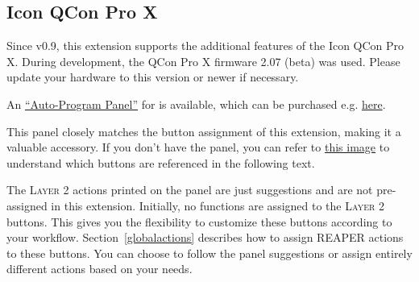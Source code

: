 \subsection{Icon QCon Pro X}\label{prox}

Since v0.9, this extension supports the additional features of the
Icon QCon Pro X. During development, the QCon Pro X firmware 2.07 (beta)
was used. Please update your hardware to this version or newer if
necessary.

An 
\href{https://s3.amazonaws.com/assets.icon-global.com/wp-content/uploads/2019/04/APP2-Reaper.jpg}{``Auto-Program
  Panel''} for \reaper is available, which can be purchased
e.g. \href{https://iconproaudio.com/shop/qcon-pro-x-auto-program-panel/}{here}.

This panel closely matches the button assignment of this extension,
making it a valuable accessory. If you don't have the panel, you can
refer to
\href{https://s3.amazonaws.com/assets.icon-global.com/wp-content/uploads/2019/04/APP2-Reaper.jpg}{this
  image} to understand which buttons are referenced in the following
text.

The \textsc{Layer 2} actions printed on the panel are just suggestions
and are not pre-assigned in this extension. Initially, no functions
are assigned to the \textsc{Layer 2} buttons. This gives you the
flexibility to customize these buttons according to your
workflow. Section~\ref{globalactions} describes how to assign REAPER
actions to these buttons. You can choose to follow the panel
suggestions or assign entirely different actions based on your needs.

